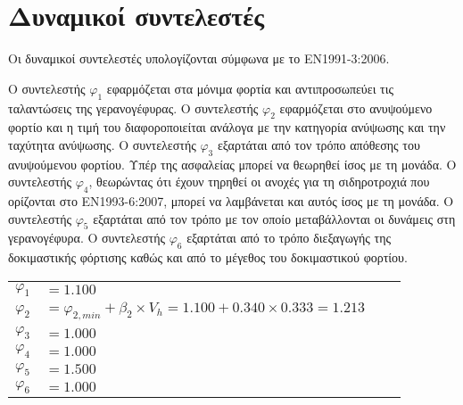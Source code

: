 \section{Δυναμικοί συντελεστές}
Οι δυναμικοί συντελεστές υπολογίζονται σύμφωνα με το ΕΝ1991-3:2006.

Ο συντελεστής $φ_1$ εφαρμόζεται στα μόνιμα φορτία και αντιπροσωπεύει τις ταλαντώσεις της γερανογέφυρας. Ο συντελεστής $φ_2$ εφαρμόζεται στο ανυψούμενο φορτίο και η τιμή του διαφοροποιείται ανάλογα με την κατηγορία ανύψωσης και την ταχύτητα ανύψωσης. Ο συντελεστής $φ_3$ εξαρτάται από τον τρόπο απόθεσης του ανυψούμενου φορτίου. Υπέρ της ασφαλείας μπορεί να θεωρηθεί ίσος με τη μονάδα. Ο συντελεστής $φ_4$, θεωρώντας ότι έχουν τηρηθεί οι ανοχές για τη σιδηροτροχιά που ορίζονται στο ΕΝ1993-6:2007, μπορεί να λαμβάνεται και αυτός ίσος με τη μονάδα. Ο συντελεστής $φ_5$ εξαρτάται από τον τρόπο με τον οποίο μεταβάλλονται οι δυνάμεις στη γερανογέφυρα. Ο συντελεστής $φ_6$ εξαρτάται από το τρόπο διεξαγωγής της δοκιμαστικής φόρτισης καθώς και από το μέγεθος του δοκιμαστικού φορτίου.

\begin{tabular}{llcr}
$φ_1$ &$= 1.100 $ \\ 
$φ_2$ &$= φ_{2,min} + β_2 \times V_h = 1.100 + 0.340 \times 0.333 = 1.213 $ \\ 
$φ_3$ &$= 1.000 $ \\ 
$φ_4$ &$= 1.000 $ \\ 
$φ_5$ &$= 1.500 $ \\ 
$φ_6$ &$= 1.000 $ 
\end{tabular}

